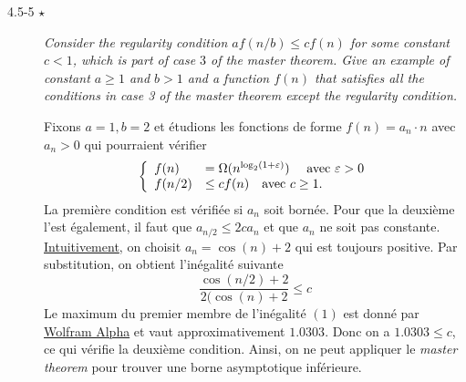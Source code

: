 \begin{description}
  \item[4.5-5 $\star$] {\itshape Consider the regularity condition $af(n/b) \le cf(n)$ for some constant $c < 1$, which is part of case $3$ of the master theorem. Give an example of constant $a\ge 1$ and $b>1$ and a function $f(n)$ that satisfies all the conditions in case 3 of the master theorem except the regularity condition.}
    \begin{ex}
      Fixons $a = 1, b = 2$ et \'etudions les fonctions de forme $f(n) = a_n\cdot n$ avec $a_n>0$ qui pourraient v\'erifier 
      \[\left\{  
          \begin{array}{ll}
            f(n) &= \Omega(n^{\log_2 (1+\varepsilon)}) \quad\textrm{ avec }\varepsilon > 0\\
            f(n/2) &\le cf(n) \quad\textrm{avec } c\ge 1.
          \end{array}
      \right.\]
      La premi\`ere condition est v\'erifi\'ee si $a_n$ soit born\'ee. Pour que la deuxi\`eme l'est \'egalement, il faut que $a_{n/2} \le 2ca_n$ et que $a_n$ ne soit pas constante. \ul{Intuitivement}, on choisit $a_n = \cos(n)+2$ qui est toujours positive. Par substitution, on obtient l'in\'egalit\'e suivante \[\frac{\cos(n/2)+2}{2(\cos(n)+2} \le c \tag{1}\] Le maximum du premier membre de l'in\'egalit\'e $(1)$ est donn\'e par \href{https://www.wolframalpha.com/input/?i=max+(cos(n%2F2)%2B2)%2F(2(cos(n)%2B2)}{Wolfram Alpha} 
et vaut approximativement $1.0303$. Donc on a $1.0303 \le c$, ce qui v\'erifie la deuxi\`eme condition. Ainsi, on ne peut appliquer le {\it master theorem} pour trouver une borne asymptotique inf\'erieure.
    \end{ex}
\end{description}


